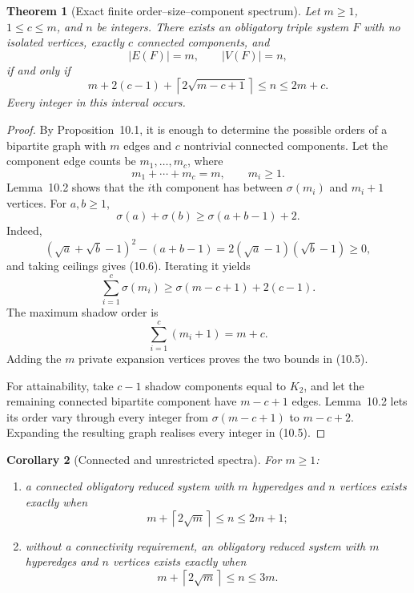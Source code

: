 \documentclass[a4paper,11pt,reqno]{amsart}
\theoremstyle{plain}
\newtheorem{theorem}{Theorem}[section]
\newtheorem{corollary}[theorem]{Corollary}
\theoremstyle{definition}
\theoremstyle{remark}
\begin{document}
\begin{theorem}[Exact finite order--size--component spectrum]\label{theorem-10.3-exact-finite-spectrum}
Let $m\ge1$, $1\le c\le m$, and $n$ be integers.  There exists an obligatory
triple system $F$ with no isolated vertices, exactly $c$ connected components,
and
\[
|E(F)|=m,
\qquad
|V(F)|=n,
\]
if and only if
\[
\boxed{
 m+2(c-1)+\left\lceil2\sqrt{m-c+1}\right\rceil
 \le n\le 2m+c.
}
\tag{10.5}
\]
Every integer in this interval occurs.
\end{theorem}

\begin{proof}
By Proposition~10.1, it is enough to determine the possible orders of a
bipartite graph with $m$ edges and $c$ nontrivial connected components.  Let
the component edge counts be $m_1,\ldots,m_c$, where
\[
m_1+\cdots+m_c=m,
\qquad
m_i\ge1.
\]
Lemma~10.2 shows that the $i$th component has between $\sigma(m_i)$ and
$m_i+1$ vertices.  For $a,b\ge1$,
\[
\sigma(a)+\sigma(b)\ge\sigma(a+b-1)+2.
\tag{10.6}
\]
Indeed,
\[
(\sqrt a+\sqrt b-1)^2-(a+b-1)
=2(\sqrt a-1)(\sqrt b-1)\ge0,
\]
and taking ceilings gives (10.6).  Iterating it yields
\[
\sum_{i=1}^c\sigma(m_i)
\ge\sigma(m-c+1)+2(c-1).
\tag{10.7}
\]
The maximum shadow order is
\[
\sum_{i=1}^c(m_i+1)=m+c.
\]
Adding the $m$ private expansion vertices proves the two bounds in (10.5).

For attainability, take $c-1$ shadow components equal to $K_2$, and let the
remaining connected bipartite component have $m-c+1$ edges.  Lemma~10.2 lets
its order vary through every integer from $\sigma(m-c+1)$ to $m-c+2$.
Expanding the resulting graph realises every integer in (10.5).
\end{proof}

\begin{corollary}[Connected and unrestricted spectra]\label{corollary-10.4-connected-unrestricted-spectra}
For $m\ge1$:
\begin{enumerate}
\item a connected obligatory reduced system with $m$ hyperedges and $n$
vertices exists exactly when
\[
\boxed{m+\left\lceil2\sqrt m\right\rceil\le n\le2m+1};
\tag{10.8}
\]
\item without a connectivity requirement, an obligatory reduced system with
$m$ hyperedges and $n$ vertices exists exactly when
\[
\boxed{m+\left\lceil2\sqrt m\right\rceil\le n\le3m}.
\tag{10.9}
\]
\end{enumerate}
\end{corollary}
\end{document}
